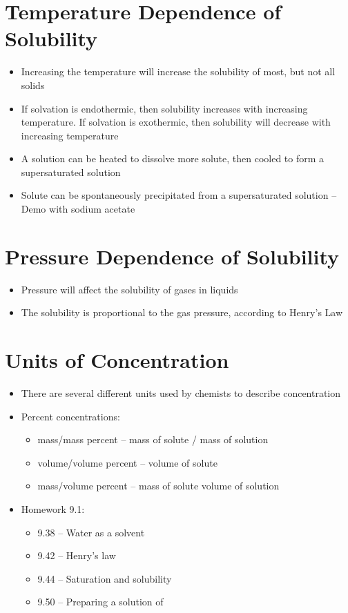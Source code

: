 \documentclass[12pt, openany, letterpaper]{memoir}
\begin{document}
\section{Temperature Dependence of Solubility}
\begin{itemize}
	\item Increasing the temperature will increase the solubility of most, but not all solids
	\item If solvation is endothermic, then solubility increases with increasing temperature. If solvation is exothermic, then solubility will decrease with increasing temperature
	\item A solution can be heated to dissolve more solute, then cooled to form a supersaturated solution
	\item Solute can be spontaneously precipitated from a supersaturated solution -- Demo with sodium acetate
\end{itemize}
\section{Pressure Dependence of Solubility}
\begin{itemize}
	\item Pressure will affect the solubility of gases in liquids
	\item The solubility is proportional to the gas pressure, according to Henry's Law
\end{itemize}
\section{Units of Concentration}
\begin{itemize}
	\item There are several different units used by chemists to describe concentration
	\item Percent concentrations:
	\begin{itemize}
		\item mass/mass percent -- mass of solute / mass of solution
		\item volume/volume percent -- volume of solute
		\item mass/volume percent -- mass of solute volume of solution
	\end{itemize}
	\item Homework 9.1:
	\begin{itemize}
		\item 9.38 -- Water as a solvent
		\item 9.42 -- Henry's law
		\item 9.44 -- Saturation and solubility
		\item 9.50 -- Preparing a solution of  
	\end{itemize}
\end{itemize}
\end{document}
